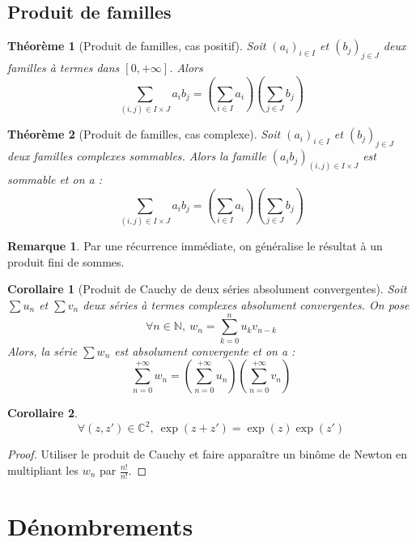 \documentclass[french]{book}
\newcommand{\N}{\mathbb{N}}
\newcommand{\C}{\mathbb{C}}
\theoremstyle{plain}
\newtheorem{thm}{Théorème}[chapter]
\newtheorem{cor}{Corollaire}[chapter]
\theoremstyle{definition}
\newtheorem{rmq}{Remarque}[chapter]
\theoremstyle{remark}
\begin{document}
\section{Produit de familles}
\begin{thm}[Produit de familles, cas positif]
	Soit $(a_i)_{i\in I}$ et $(b_j)_{j\in J}$ deux familles à termes dans $[0,+\infty]$. Alors $$\sum_{(i,j)\in I\times J}a_ib_j=\left(\sum_{i\in I}a_i\right)\left(\sum_{j\in J}b_j\right)$$
\end{thm}
\begin{thm}[Produit de familles, cas complexe]
	Soit $(a_i)_{i\in I}$ et $(b_j)_{j\in J}$ deux familles complexes sommables. Alors la famille $(a_ib_j)_{(i,j)\in I\times J}$ est sommable et on a :$$\sum_{(i,j)\in I\times J}a_ib_j=\left(\sum_{i\in I}a_i\right)\left(\sum_{j\in J}b_j\right)$$
\end{thm}
\begin{rmq} Par une récurrence immédiate, on généralise le résultat à un produit fini de sommes. \end{rmq}
\begin{cor}[Produit de Cauchy de deux séries absolument convergentes]
	Soit $\displaystyle \sum u_n$ et $\displaystyle \sum v_n$ deux séries à termes complexes absolument convergentes. On pose $$\forall n\in\N,\ w_n=\sum_{k=0}^{n}u_kv_{n-k}$$ Alors, la série $\displaystyle \sum w_n$ est absolument convergente et on a :$$\sum_{n=0}^{+\infty}w_n=\left(\sum_{n=0}^{+\infty}u_n\right)\left(\sum_{n=0}^{+\infty}v_n\right)$$
\end{cor}
\begin{cor}
	$$\forall(z,z')\in\C^2,\ \exp(z+z')=\exp(z)\exp(z')$$
\end{cor}
\begin{proof}
	Utiliser le produit de Cauchy et faire apparaître un binôme de Newton en multipliant les $w_n$ par $\displaystyle \frac{n!}{n!}$.
\end{proof}

\newpage
\chapter{Dénombrements}
\end{document}
